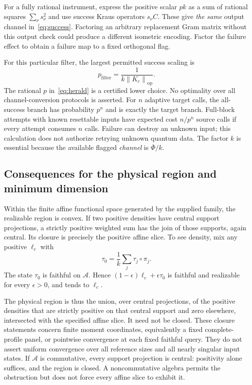 \documentclass[11pt,a4paper]{article}
\theoremstyle{definition}\newtheorem{definition}[theorem]{Definition}
\newcommand{\Alg}{\mathcal A}
\newcommand{\norm}[1]{\left\lVert #1\right\rVert}
\begin{document}
For a fully rational instrument, express the positive scalar $pk$ as a sum of rational squares $\sum_\nu s_\nu^2$ and use success Kraus operators $s_\nu C$. These give \emph{the same} output channel in~\eqref{eq:success}. Factoring an arbitrary replacement Gram matrix without this output check could produce a different isometric encoding. Factor the failure effect to obtain a failure map to a fixed orthogonal flag.

For this particular filter, the largest permitted success scaling is
\[
 p_{\mathrm{filter}}=\frac1{k\norm{K_c}_{\mathrm{op}}}.
\]
The rational $p$ in~\eqref{eq:herald} is a certified lower choice. No optimality over all channel-conversion protocols is asserted. For $n$ adaptive target calls, the all-success branch has probability $p^n$ and is exactly the target branch. Full-block attempts with known resettable inputs have expected cost $n/p^n$ source calls if every attempt consumes $n$ calls. Failure can destroy an unknown input; this calculation does not authorize retrying unknown quantum data. The factor $k$ is essential because the available flagged \emph{channel} is $\overline\Phi/k$.

\subsection{Consequences for the physical region and minimum dimension}

Within the finite affine functional space generated by the supplied family, the realizable region is convex. If two positive densities have central support projections, a strictly positive weighted sum has the join of those supports, again central. Its closure is precisely the positive affine slice. To see density, mix any positive $\ell_c$ with
\[
 \tau_0=\frac1k\sum_j\tau_j\circ\pi_j.
\]
The state $\tau_0$ is faithful on $\Alg$. Hence $(1-\epsilon)\ell_c+\epsilon\tau_0$ is faithful and realizable for every $\epsilon>0$, and tends to $\ell_c$.

The physical region is thus the union, over central projections, of the positive densities that are strictly positive on that central support and zero elsewhere, intersected with the specified affine slice. It need not be closed. These closure statements concern finite moment coordinates, equivalently a fixed complete-profile panel, or pointwise convergence at each fixed faithful query. They do not assert uniform convergence over all reference sizes and all nearly singular input states. If $\Alg$ is commutative, every support projection is central: positivity alone suffices, and the region is closed. A noncommutative algebra permits the obstruction but does not force every affine slice to exhibit it.
\end{document}

